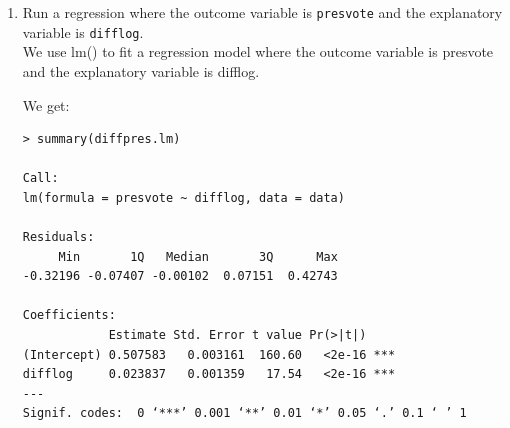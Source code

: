 \documentclass[12pt,letterpaper]{article}
\begin{document}
	\begin{enumerate}
		\item Run a regression where the outcome variable is \texttt{presvote} and the explanatory variable is \texttt{difflog}.	\\
\noindent We use lm() to fit a regression model where the outcome variable is presvote and the explanatory variable is difflog.\\
\vspace{.5cm}
  
\vspace{.5cm}  
\noindent We get:\\
\begin{verbatim}
> summary(diffpres.lm)

Call:
lm(formula = presvote ~ difflog, data = data)

Residuals:
     Min       1Q   Median       3Q      Max 
-0.32196 -0.07407 -0.00102  0.07151  0.42743 

Coefficients:
            Estimate Std. Error t value Pr(>|t|)    
(Intercept) 0.507583   0.003161  160.60   <2e-16 ***
difflog     0.023837   0.001359   17.54   <2e-16 ***
---
Signif. codes:  0 ‘***’ 0.001 ‘**’ 0.01 ‘*’ 0.05 ‘.’ 0.1 ‘ ’ 1


\end{verbatim}
\end{enumerate}
\end{document}
